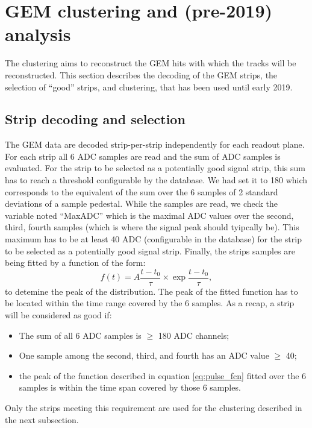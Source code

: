 \section{GEM clustering and (pre-2019) analysis}
\label{clustering}

The clustering aims to reconstruct the GEM hits with which the tracks will be reconstructed.
This section describes the decoding of the GEM strips, the selection of ``good'' strips, and clustering, that has been used until early 2019.

\subsection{Strip decoding and selection}
\label{strip_sel}

The GEM data are decoded strip-per-strip independently for each readout plane.
For each strip all 6 ADC samples are read and the sum of ADC samples is evaluated.
For the strip to be selected as a potentially good signal strip, this sum has to reach a threshold configurable by the database.
We had set it to 180 which corresponds to the equivalent of the sum over the 6 samples of 2 standard deviations of a sample pedestal.
While the samples are read, we check the variable noted ``MaxADC'' which is the maximal ADC values over the second, third, fourth samples (which is where the signal peak should tyipcally be). This maximum has to be at least 40 ADC (configurable in the database) for the strip to be selected as a potentially good signal strip.  
Finally, the strips samples are being fitted by a function of the form:
%
\begin{equation}
  f(t) = A \frac{t-t_0}{\tau} \times \exp{\frac{t-t_0}{\tau}},
  \label{eq:pulse_fcn}
\end{equation}
%
to detemine the peak of the distribution. The peak of the fitted function has to be located within the time range covered by the 6 samples.
As a recap, a strip will be considered as good if:
%
\begin{itemize}
\item{The sum of all 6 ADC samples is $\geq$ 180 ADC channels;}
\item{One sample among the second, third, and fourth has an ADC value $\geq$ 40;}
\item{the peak of the function described in equation \ref{eq:pulse_fcn} fitted over the 6 samples is within the time span covered by those 6 samples.}
\end{itemize}
%
Only the strips meeting this requirement are used for the clustering described in the next subsection.

